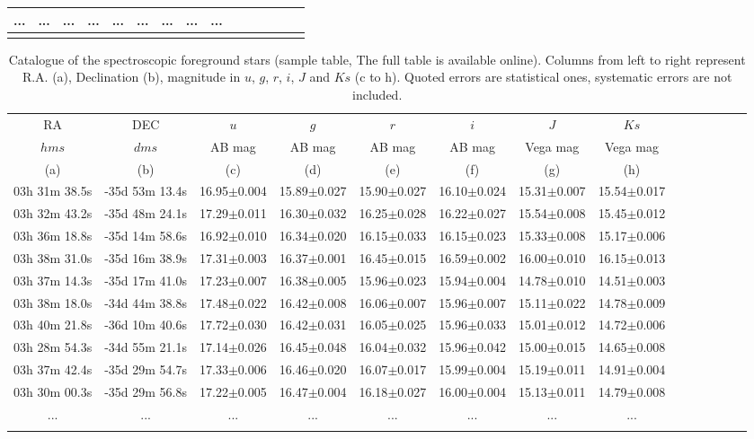 \documentclass[fleqn,usenatbib]{mnras}
\begin{document}
\begin{table*}
\begin{tabular}{ ccccccccccccccc }
... & ... & ... & ... & ... & ... & ... & ... & ...  \\
\hline
\label{specucdgccat}
\end{tabular}
\end{table*}


\begin{table*}
\caption{Catalogue of the spectroscopic foreground stars (sample table, The full table is available online). Columns from left to right represent R.A. (a), Declination (b), magnitude in $u$, $g$, $r$, $i$, $J$ and $Ks$ (c to h). Quoted errors are statistical ones, systematic errors are not included.}
\begin{tabular}{ cccccccccccccc } \hline  
RA & DEC & $u$ & $g$ & $r$ & $i$ & $J$ & $Ks$ \\
$hms$ & $dms$ & AB mag & AB mag & AB mag & AB mag & Vega mag & Vega mag \\
(a) & (b) &  (c) &  (d) &  (e) &  (f) &  (g)  &  (h)\\
\hline
03h 31m 38.5s & -35d 53m 13.4s & 16.95$\pm$0.004 & 15.89$\pm$0.027 & 15.90$\pm$0.027 & 16.10$\pm$0.024 & 15.31$\pm$0.007 & 15.54$\pm$0.017  \\
03h 32m 43.2s & -35d 48m 24.1s & 17.29$\pm$0.011 & 16.30$\pm$0.032 & 16.25$\pm$0.028 & 16.22$\pm$0.027 & 15.54$\pm$0.008 & 15.45$\pm$0.012  \\
03h 36m 18.8s & -35d 14m 58.6s & 16.92$\pm$0.010 & 16.34$\pm$0.020 & 16.15$\pm$0.033 & 16.15$\pm$0.023 & 15.33$\pm$0.008 & 15.17$\pm$0.006  \\
03h 38m 31.0s & -35d 16m 38.9s & 17.31$\pm$0.003 & 16.37$\pm$0.001 & 16.45$\pm$0.015 & 16.59$\pm$0.002 & 16.00$\pm$0.010 & 16.15$\pm$0.013  \\
03h 37m 14.3s & -35d 17m 41.0s & 17.23$\pm$0.007 & 16.38$\pm$0.005 & 15.96$\pm$0.023 & 15.94$\pm$0.004 & 14.78$\pm$0.010 & 14.51$\pm$0.003  \\
03h 38m 18.0s & -34d 44m 38.8s & 17.48$\pm$0.022 & 16.42$\pm$0.008 & 16.06$\pm$0.007 & 15.96$\pm$0.007 & 15.11$\pm$0.022 & 14.78$\pm$0.009  \\
03h 40m 21.8s & -36d 10m 40.6s & 17.72$\pm$0.030 & 16.42$\pm$0.031 & 16.05$\pm$0.025 & 15.96$\pm$0.033 & 15.01$\pm$0.012 & 14.72$\pm$0.006  \\
03h 28m 54.3s & -34d 55m 21.1s & 17.14$\pm$0.026 & 16.45$\pm$0.048 & 16.04$\pm$0.032 & 15.96$\pm$0.042 & 15.00$\pm$0.015 & 14.65$\pm$0.008  \\
03h 37m 42.4s & -35d 29m 54.7s & 17.33$\pm$0.006 & 16.46$\pm$0.020 & 16.07$\pm$0.017 & 15.99$\pm$0.004 & 15.19$\pm$0.011 & 14.91$\pm$0.004  \\
03h 30m 00.3s & -35d 29m 56.8s & 17.22$\pm$0.005 & 16.47$\pm$0.004 & 16.18$\pm$0.027 & 16.00$\pm$0.004 & 15.13$\pm$0.011 & 14.79$\pm$0.008  \\


... & ... & ... & ... & ... & ... & ... & ... \\
\hline
\label{fore}
\end{tabular}
\end{table*}
\end{document}

